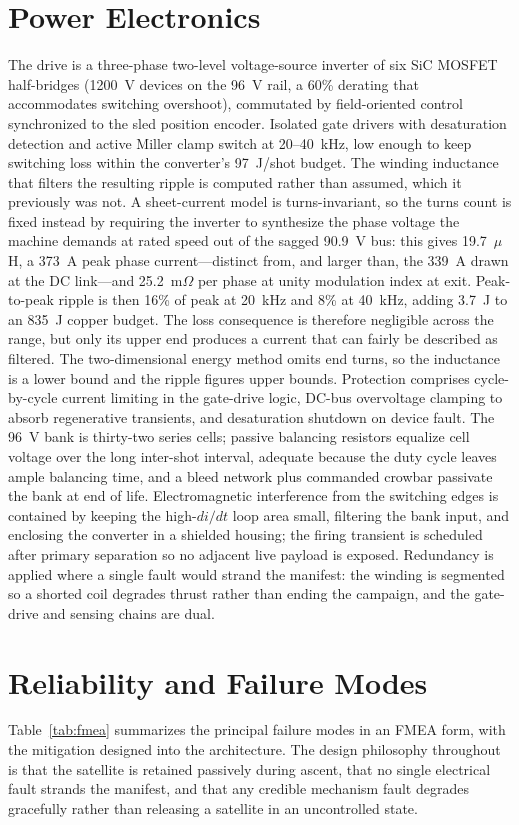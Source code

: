 \documentclass[conference]{IEEEtran}
\begin{document}
\section{Power Electronics}\label{sec:pe}
The drive is a three-phase two-level voltage-source inverter of six SiC MOSFET half-bridges (1200~V devices on the 96~V rail, a 60\% derating that accommodates switching overshoot), commutated by field-oriented control synchronized to the sled position encoder. Isolated gate drivers with desaturation detection and active Miller clamp switch at 20--40~kHz, low enough to keep switching loss within the converter's 97~J/shot budget. The winding inductance that filters the resulting ripple is computed rather than assumed, which it previously was not. A sheet-current model is turns-invariant, so the turns count is fixed instead by requiring the inverter to synthesize the phase voltage the machine demands at rated speed out of the sagged 90.9~V bus: this gives 19.7~$\mu$H, a 373~A peak phase current---distinct from, and larger than, the 339~A drawn at the DC link---and 25.2~m$\Omega$ per phase at unity modulation index at exit. Peak-to-peak ripple is then 16\% of peak at 20~kHz and 8\% at 40~kHz, adding 3.7~J to an 835~J copper budget. The loss consequence is therefore negligible across the range, but only its upper end produces a current that can fairly be described as filtered. The two-dimensional energy method omits end turns, so the inductance is a lower bound and the ripple figures upper bounds. Protection comprises cycle-by-cycle current limiting in the gate-drive logic, DC-bus overvoltage clamping to absorb regenerative transients, and desaturation shutdown on device fault. The 96~V bank is thirty-two series cells; passive balancing resistors equalize cell voltage over the long inter-shot interval, adequate because the duty cycle leaves ample balancing time, and a bleed network plus commanded crowbar passivate the bank at end of life. Electromagnetic interference from the switching edges is contained by keeping the high-$di/dt$ loop area small, filtering the bank input, and enclosing the converter in a shielded housing; the firing transient is scheduled after primary separation so no adjacent live payload is exposed. Redundancy is applied where a single fault would strand the manifest: the winding is segmented so a shorted coil degrades thrust rather than ending the campaign, and the gate-drive and sensing chains are dual.

\section{Reliability and Failure Modes}\label{sec:fmea}
Table~\ref{tab:fmea} summarizes the principal failure modes in an FMEA form, with the mitigation designed into the architecture. The design philosophy throughout is that the satellite is retained passively during ascent, that no single electrical fault strands the manifest, and that any credible mechanism fault degrades gracefully rather than releasing a satellite in an uncontrolled state.
\end{document}

